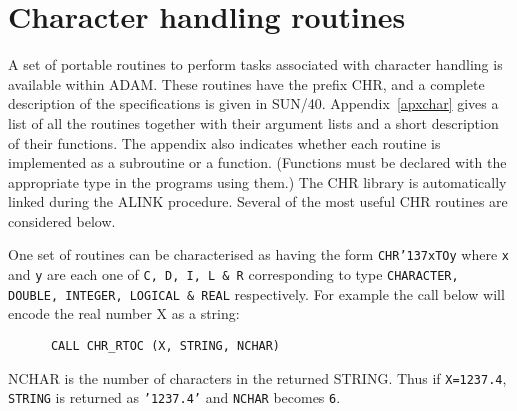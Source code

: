 \documentclass[twoside,11pt]{article}
\renewcommand{\_}{{\tt\char'137}}
\newcommand{\xref}[3]{#1}
\newcommand{\xlabel}[1]{}
\begin{document}
\newpage
\section{Character handling routines\label{char}\xlabel{character_handling_routines}}

A set of portable routines to perform tasks associated with 
character handling is available within ADAM.
These routines have the prefix CHR, and a complete description of the 
specifications is given in \xref{SUN/40}{sun40}{}.
Appendix~\ref{apxchar} gives a list of all the routines together with 
their argument lists and a short description of their functions.
The appendix also indicates
whether  each routine is implemented as a subroutine or a function.
(Functions must be declared with the appropriate type in the programs using 
them.)
The CHR library is automatically linked during the ALINK procedure.
Several of the most useful CHR routines are considered below.

One set of routines can be characterised as having the form
{\tt CHR\_xTOy} where {\tt x} and {\tt y} are each  one  
of {\tt C, D, I, L \& R} corresponding to type
{\tt CHARACTER, DOUBLE, INTEGER, LOGICAL \& REAL} respectively.
For example the call below will encode the  real number X as a string:
\begin{verbatim}
      CALL CHR_RTOC (X, STRING, NCHAR)
\end{verbatim}
NCHAR is the number of characters in the returned STRING.
Thus if {\tt X=1237.4}, {\tt STRING} is returned as {\tt'1237.4'} 
and {\tt NCHAR} becomes {\tt 6}.
\end{document}
